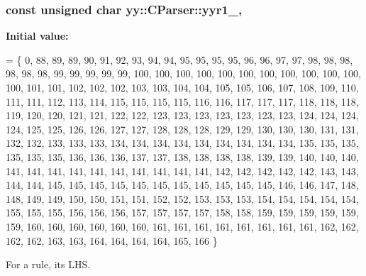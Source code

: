 \hypertarget{classyy_1_1CParser_a55e9961fafd87c212377c2279cb3082c}{
\subsubsection[{yyr1\-\_\-}]{\setlength{\rightskip}{0pt plus 5cm}const unsigned char yy\-::\-C\-Parser\-::yyr1\-\_\-\hspace{0.3cm}{\ttfamily [static]}, {\ttfamily [private]}}}\label{classyy_1_1CParser_a55e9961fafd87c212377c2279cb3082c}
{\bfseries Initial value\-:}
\begin{DoxyCode}
=
  \{
         0,    88,    89,    89,    90,    91,    92,    93,    94,    94,
      95,    95,    95,    95,    96,    96,    97,    97,    98,    98,
      98,    98,    98,    98,    99,    99,    99,    99,    99,   100,
     100,   100,   100,   100,   100,   100,   100,   100,   100,   100,
     100,   101,   101,   102,   102,   102,   103,   103,   104,   104,
     105,   105,   106,   107,   108,   109,   110,   111,   111,   112,
     113,   114,   115,   115,   115,   115,   116,   116,   117,   117,
     117,   118,   118,   118,   119,   120,   120,   121,   121,   122,
     122,   123,   123,   123,   123,   123,   123,   123,   124,   124,
     124,   124,   125,   125,   126,   126,   127,   127,   128,   128,
     128,   129,   129,   130,   130,   130,   131,   131,   132,   132,
     133,   133,   133,   134,   134,   134,   134,   134,   134,   134,
     134,   134,   135,   135,   135,   135,   135,   135,   136,   136,
     136,   137,   137,   138,   138,   138,   138,   139,   139,   140,
     140,   140,   141,   141,   141,   141,   141,   141,   141,   141,
     141,   141,   142,   142,   142,   142,   142,   143,   143,   144,
     144,   145,   145,   145,   145,   145,   145,   145,   145,   145,
     145,   145,   146,   146,   147,   148,   148,   149,   149,   150,
     150,   151,   151,   152,   152,   153,   153,   153,   154,   154,
     154,   154,   154,   155,   155,   155,   156,   156,   156,   157,
     157,   157,   157,   158,   158,   159,   159,   159,   159,   159,
     159,   160,   160,   160,   160,   160,   160,   161,   161,   161,
     161,   161,   161,   161,   161,   162,   162,   162,   162,   163,
     163,   164,   164,   164,   164,   165,   166
  \}
\end{DoxyCode}


For a rule, its L\-H\-S. 

